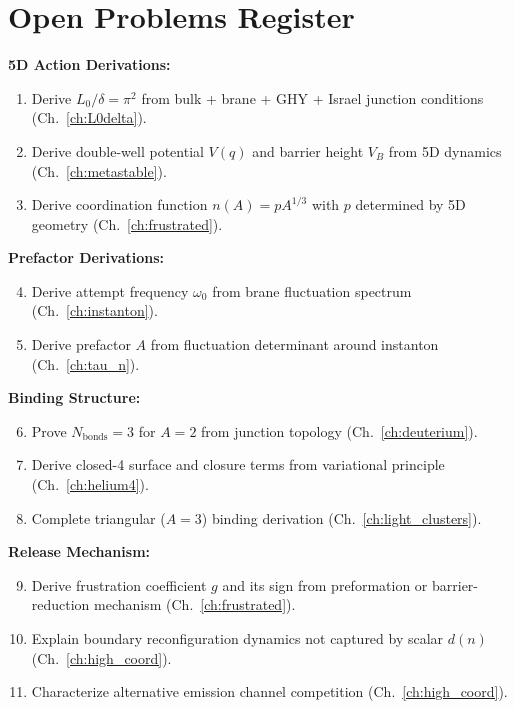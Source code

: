 \section{Open Problems Register}
\label{sec:unified:open}

\begin{edcopenbox}[title=Consolidated Open Problems]
\textbf{5D Action Derivations:}
\begin{enumerate}
    \item Derive $L_0/\delta = \pi^2$ from bulk + brane + GHY + Israel
          junction conditions (Ch.~\ref{ch:L0delta}).
    \item Derive double-well potential $V(q)$ and barrier height $V_B$
          from 5D dynamics (Ch.~\ref{ch:metastable}).
    \item Derive coordination function $n(A) = p A^{1/3}$ with $p$
          determined by 5D geometry (Ch.~\ref{ch:frustrated}).
\end{enumerate}

\textbf{Prefactor Derivations:}
\begin{enumerate}
    \setcounter{enumi}{3}
    \item Derive attempt frequency $\omega_0$ from brane fluctuation
          spectrum (Ch.~\ref{ch:instanton}).
    \item Derive prefactor $A$ from fluctuation determinant around
          instanton (Ch.~\ref{ch:tau_n}).
\end{enumerate}

\textbf{Binding Structure:}
\begin{enumerate}
    \setcounter{enumi}{5}
    \item Prove $N_{\text{bonds}} = 3$ for $A = 2$ from junction topology
          (Ch.~\ref{ch:deuterium}).
    \item Derive closed-4 surface and closure terms from variational
          principle (Ch.~\ref{ch:helium4}).
    \item Complete triangular ($A = 3$) binding derivation
          (Ch.~\ref{ch:light_clusters}).
\end{enumerate}

\textbf{Release Mechanism:}
\begin{enumerate}
    \setcounter{enumi}{8}
    \item Derive frustration coefficient $g$ and its sign from
          preformation or barrier-reduction mechanism (Ch.~\ref{ch:frustrated}).
    \item Explain boundary reconfiguration dynamics not captured by
          scalar $d(n)$ (Ch.~\ref{ch:high_coord}).
    \item Characterize alternative emission channel competition
          (Ch.~\ref{ch:high_coord}).
\end{enumerate}


\end{edcopenbox}
